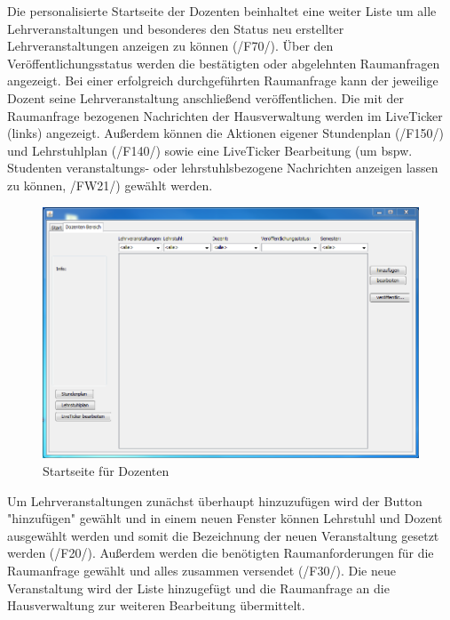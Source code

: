 Die personalisierte Startseite der Dozenten beinhaltet eine weiter Liste um alle Lehrveranstaltungen und besonderes den Status neu erstellter Lehrveranstaltungen anzeigen zu können (/F70/). Über den Veröffentlichungsstatus werden die bestätigten oder abgelehnten Raumanfragen angezeigt. Bei einer erfolgreich durchgeführten Raumanfrage kann der jeweilige Dozent seine Lehrveranstaltung anschließend veröffentlichen. Die mit der Raumanfrage bezogenen Nachrichten der Hausverwaltung werden im LiveTicker (links) angezeigt.
Außerdem können die Aktionen eigener Stundenplan (/F150/) und Lehrstuhlplan (/F140/) sowie eine LiveTicker Bearbeitung (um bspw. Studenten veranstaltungs- oder lehrstuhlsbezogene Nachrichten anzeigen lassen zu können, /FW21/) gewählt werden.
\begin{figure}[H]
\begin{center}
\includegraphics[width=170mm]{images/section_7/DozentenHauptseite.PNG}
\caption{Startseite für Dozenten}
\label{img:StartDoz}
\end{center}
\end{figure}
Um Lehrveranstaltungen zunächst überhaupt hinzuzufügen wird der Button "hinzufügen" gewählt und in einem neuen Fenster können Lehrstuhl und Dozent ausgewählt werden und somit die Bezeichnung der neuen Veranstaltung gesetzt werden (/F20/). Außerdem werden die benötigten Raumanforderungen für die Raumanfrage gewählt und alles zusammen versendet (/F30/). Die neue Veranstaltung wird der Liste hinzugefügt und die Raumanfrage an die Hausverwaltung zur weiteren Bearbeitung übermittelt.
